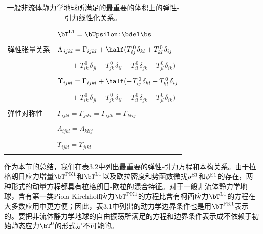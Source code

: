 \begin{table}
\begin{tabular}{|l|l|}
& $\bT^{\rm L1}=\bUpsilon\!:\!\bdel\bs$ \\
& \\
\index{tensor!elastic}%
\index{elastic tensor}%
弹性张量关系
& $\Lambda_{\,ijkl}=\Gamma_{ijkl}+\half(T^{\,0}_{ij\,}\delta_{kl}
+T^{\,0}_{kl\,}\delta_{ij}$ \\
\vspace{-1.6 mm} & \vspace{-1.6 mm} \\
& $\qquad+T^{\,0}_{ik\,}\delta_{jl}-T^{\,0}_{jk\,}\delta_{il}
-T^{\,0}_{il\,}\delta_{jk}-T^{\,0}_{jl\,}\delta_{ik})$ \\
& \\
& $\Upsilon_{ijkl}=\Gamma_{ijkl}+\half(-T^{\,0}_{ij\,}\delta_{kl}
+T^{\,0}_{kl\,}\delta_{ij}$ \\
\vspace{-1.6 mm} & \vspace{-1.56mm} \\
& $\qquad+T^{\,0}_{ik\,}\delta_{jl}+T^{\,0}_{jk\,}\delta_{il}
-T^{\,0}_{il\,}\delta_{jk}-T^{\,0}_{jl\,}\delta_{ik})$ \\
& \\
弹性对称性
& $\Gamma_{ijkl}=\Gamma_{jikl}=\Gamma_{ijlk}=\Gamma_{klij}$ \\
\vspace{-1.8 mm} & \vspace{-1.8 mm} \\
& $\Lambda_{ijkl}=\Lambda_{klij}$ \\
\vspace{-1.8 mm} & \vspace{-1.8 mm} \\
& $\Upsilon_{ijkl}=\Upsilon_{jikl}$ \\
& \\ \hline
\end{tabular}
\caption[lineqns]{一般非流体静力学地球所满足的最重要的体积上的弹性-引力线性化关系。}
\end{table}

作为本节的总结，我们在表3.2中列出最重要的弹性-引力方程和本构关系。由于拉格朗日应力增量$\bT^{\rm PK1}$和$\bT^{\rm L1}$以及欧拉密度和势函数微扰$\rho^{\rm E1}$和$\phi^{\rm E1}$的存在，两种形式的动量方程都具有拉格朗日-欧拉的混合特征。对于一般非流体静力学地球，含有第一类Piola-Kirchhoff应力$\bT^{\rm PK1}$的方程比含有柯西应力$\bT^{\rm L1}$的方程在大多数应用中更方便；因此，表3.1中列出的动力学边界条件也是用$\bT^{\rm PK1}$表示的。要把非流体静力学地球的自由振荡所满足的方程和边界条件表示成不依赖于初始静态应力$\bT^0$的形式是不可能的。

